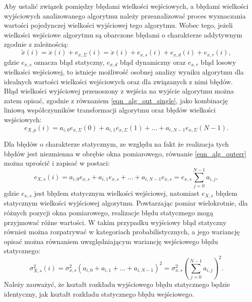 Aby ustalić związek pomiędzy błędami wielkości wejściowych, a błędami wielkości wyjściowych analizowanego algorytmu należy przeanalizować proces wyznaczania wartości pojedynczej wielkości wyjściowej tego algorytmu. Wobec tego, jeżeli wielkości wejściowe algorytmu są obarczone błędami o charakterze addytywnym zgodnie z zależnością:
\begin{equation}
\tilde{x} \left( i \right) = \dot{x} \left( i \right) + e_{x,\Sigma} \left( i \right) = \dot{x} \left( i \right) + e_{x,s} \left( i \right) + e_{x,d} \left( i \right) + e_{x,r} \left( i \right) \label{eqn_alg_inputval},
\end{equation}
gdzie $e_{x,s}$ oznacza błąd statyczny, $e_{x,d}$ błąd dynamiczny oraz $e_{x,r}$ błąd losowy wielkości wejściowej, to istnieje możliwość osobnej analizy wyniku algorytmu dla idealnych wartości wielkości wejściowych oraz dla związanych z nimi błędów. Błąd wielkości wyjściowej przenoszony z wejścia na wyjście algorytmu można zatem opisać, zgodnie z równaniem \eqref{eqn_alg_out_single}, jako kombinację liniową współczynników transformacji algorytmu oraz błędów wielkości wejściowych:
\begin{equation}
e_{X,p} \left( i \right) = a_{i, 0} e_{x,\Sigma} \left( 0 \right) + a_{i, 1} e_{x,\Sigma} \left( 1 \right) + \hdots + a_{i, N-1} e_{x,\Sigma} \left( N-1 \right) \label{eqn_alg_outerr}.
\end{equation}

Dla błędów o charakterze statycznym, ze względu na fakt że realizacja tych błędów jest niezmienna w obrębie okna pomiarowego, równanie \eqref{eqn_alg_outerr} można uprościć i zapisać w postaci:
\begin{equation}
e_{X,s} \left( i \right) = a_{i, 0} e_{x,s} + a_{i, 1} e_{x,s} + \hdots + a_{i, N-1} e_{x,s} = e_{x,s} \sum _{j = 0} ^{N-1} a_{i, j} \label{eqn_alg_outerr_stat},
\end{equation}
gdzie $e_{x,s}$ jest błędem statycznym wielkości wejściowej, natomiast $e_{X,s}$ błędem statycznym wielkości wyjściowej algorytmu. Powtarzając pomiar wielokrotnie, dla różnych pozycji okna pomiarowego, realizacje błędu statycznego mogą przyjmować różne wartości. W takim przypadku wyjściowy błąd statyczny również można rozpatrywać w kategoriach probabilistycznych, a jego wariancję opisać można równaniem uwzględniającym wariancję wejściowego błędu statycznego:
\begin{equation}
\sigma_{X,s}^{2} \left( i \right) = \sigma_{x,s}^{2} \left( a_{i, 0} + a_{i, 1} + \hdots + a_{i, N-1} \right)^{2} = \sigma_{x,s}^{2} \left( \sum _{j = 0} ^{N-1} a_{i, j} \right)^{2} \label{eqn_alg_outvar_stat}.
\end{equation}
Należy zauważyć, że kształt rozkładu wyjściowego błędu statycznego będzie identyczny, jak kształt rozkładu statycznego błędu wejściowego.

